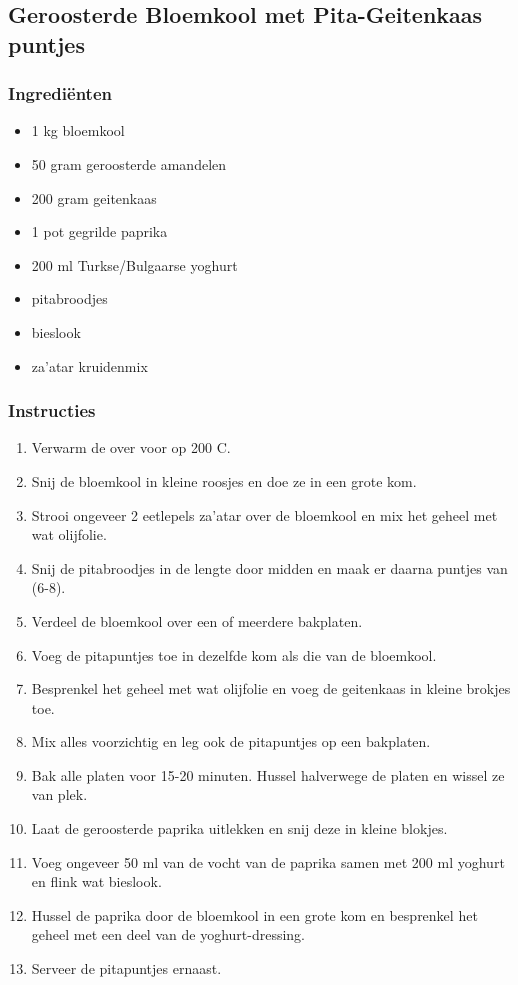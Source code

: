 \subsection{Geroosterde Bloemkool met Pita-Geitenkaas puntjes}
\subsubsection*{Ingrediënten}
\begin{multicols}{2}
    \begin{itemize}
        \item 1 kg bloemkool
        \item 50 gram geroosterde amandelen
        \item 200 gram geitenkaas
        \item 1 pot gegrilde paprika
        \item 200 ml Turkse/Bulgaarse yoghurt
        \item pitabroodjes
        \item bieslook
        \item za'atar kruidenmix
    \end{itemize}
\end{multicols}

\subsubsection*{Instructies}
\begin{multicols}{2}
    \begin{enumerate}
        \item Verwarm de over voor op 200 C.
        \item Snij de bloemkool in kleine roosjes en doe ze in een grote kom.
        \item Strooi ongeveer 2 eetlepels za'atar over de bloemkool en mix het geheel met wat olijfolie.
        \item Snij de pitabroodjes in de lengte door midden en maak er daarna puntjes van (6-8).
        \item Verdeel de bloemkool over een of meerdere bakplaten.
        \item Voeg de pitapuntjes toe in dezelfde kom als die van de bloemkool.
        \item Besprenkel het geheel met wat olijfolie en voeg de geitenkaas in kleine brokjes toe.
        \item Mix alles voorzichtig en leg ook de pitapuntjes op een bakplaten.
        \item Bak alle platen voor 15-20 minuten. Hussel halverwege de platen en wissel ze van plek.
        \item Laat de geroosterde paprika uitlekken en snij deze in kleine blokjes.
        \item Voeg ongeveer 50 ml van de vocht van de paprika samen met 200 ml yoghurt en flink wat bieslook.
        \item Hussel de paprika door de bloemkool in een grote kom en besprenkel het geheel met een deel van de yoghurt-dressing.
        \item Serveer de pitapuntjes ernaast.
    \end{enumerate}
\end{multicols}